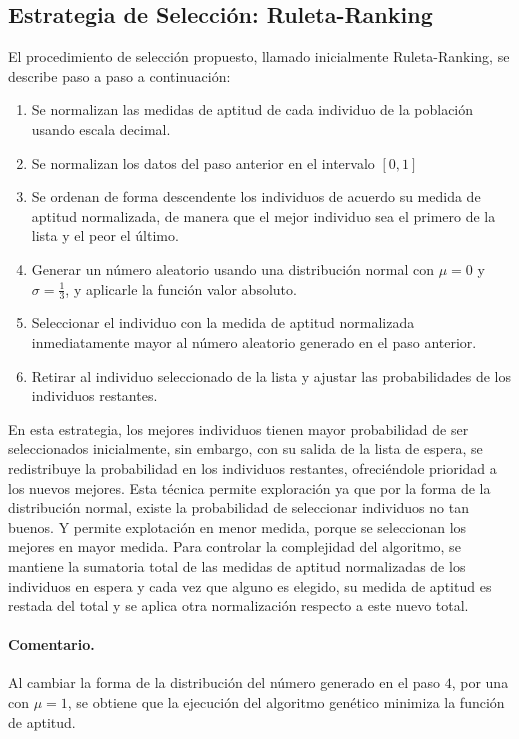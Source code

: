 \documentclass{llncs}
\begin{document}
\subsection{Estrategia de Selección: Ruleta-Ranking}
El procedimiento de selección propuesto, llamado inicialmente Ruleta-Ranking, se describe paso a paso a continuación:
\begin{enumerate}
\item Se normalizan las medidas de aptitud de cada individuo de la población usando escala decimal.
\item Se normalizan los datos del paso anterior en el intervalo $[0,1]$
\item Se ordenan de forma descendente los individuos de acuerdo su medida de aptitud normalizada, de manera que el mejor individuo sea el primero de la lista y el peor el último.
\item Generar un número aleatorio usando una distribución normal con $\mu=0$ y $\sigma=\frac{1}{3}$, y aplicarle la función valor absoluto.
\item Seleccionar el individuo con la medida de aptitud normalizada inmediatamente mayor al número aleatorio generado en el paso anterior.
\item Retirar al individuo seleccionado de la lista y ajustar las probabilidades de los individuos restantes.
\end{enumerate}
En esta estrategia, los mejores individuos tienen mayor probabilidad de ser seleccionados inicialmente, sin embargo, con su salida de la lista de espera, se redistribuye la probabilidad en los individuos restantes, ofreciéndole prioridad a los nuevos mejores. Esta técnica permite exploración ya que por la forma de la distribución normal, existe la probabilidad de seleccionar individuos no tan buenos. Y permite explotación en menor medida, porque se seleccionan los mejores en mayor medida. 
Para controlar la complejidad del algoritmo, se mantiene la sumatoria total de las medidas de aptitud normalizadas de los individuos en espera y cada vez que alguno es elegido, su medida de aptitud es restada del total y se aplica otra normalización respecto a este nuevo total.

\paragraph{Comentario.}
Al cambiar la forma de la distribución del número generado en el paso $4$, por una con $\mu=1$, se obtiene que la ejecución del algoritmo genético minimiza la función de aptitud.
\end{document}
